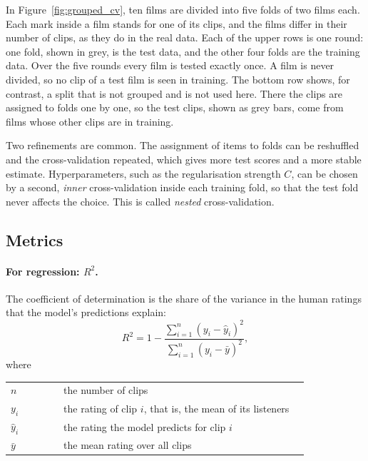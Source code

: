 In Figure~\ref{fig:grouped_cv}, ten films are divided into five folds of two films each. Each mark inside a film stands for one of its clips, and the films differ in their number of clips, as they do in the real data. Each of the upper rows is one round: one fold, shown in grey, is the test data, and the other four folds are the training data. Over the five rounds every film is tested exactly once. A film is never divided, so no clip of a test film is seen in training. The bottom row shows, for contrast, a split that is not grouped and is not used here. There the clips are assigned to folds one by one, so the test clips, shown as grey bars, come from films whose other clips are in training.

Two refinements are common. The assignment of items to folds can be reshuffled and the cross-validation repeated, which gives more test scores and a more stable estimate. Hyperparameters, such as the regularisation strength $C$, can be chosen by a second, \emph{inner} cross-validation inside each training fold, so that the test fold never affects the choice. This is called \emph{nested} cross-validation.

\subsection{Metrics}

\paragraph{For regression: $R^2$.} The coefficient of determination is the share of the variance in the human ratings that the model's predictions explain:
\begin{equation}
  R^2 = 1 - \frac{\sum_{i=1}^{n} (y_i - \hat{y}_i)^2}{\sum_{i=1}^{n} (y_i - \bar{y})^2},
\end{equation}
where

\smallskip
\noindent\begin{tabular}{@{}p{0.17\linewidth}p{0.79\linewidth}@{}}
  $n$ & the number of clips \\
  $y_i$ & the rating of clip $i$, that is, the mean of its listeners \\
  $\hat{y}_i$ & the rating the model predicts for clip $i$ \\
  $\bar{y}$ & the mean rating over all clips \\
\end{tabular}
\smallskip

